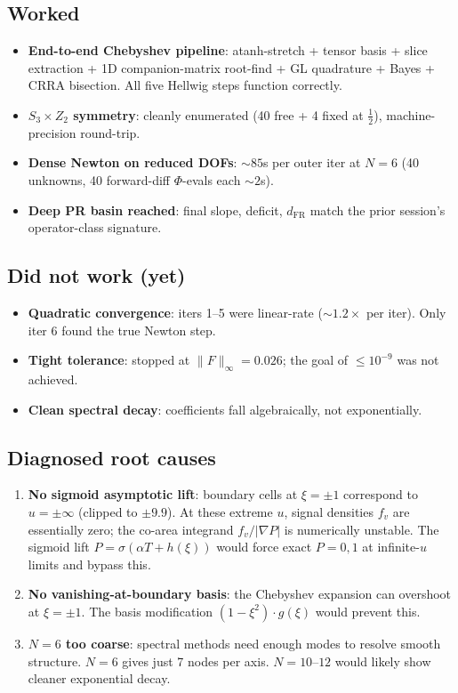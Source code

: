 \documentclass[11pt]{article}
\begin{document}
\subsection*{Worked}
\begin{itemize}
\item \textbf{End-to-end Chebyshev pipeline}: atanh-stretch + tensor basis +
slice extraction + 1D companion-matrix root-find + GL quadrature + Bayes +
CRRA bisection. All five Hellwig steps function correctly.
\item \textbf{$S_3 \times Z_2$ symmetry}: cleanly enumerated (40 free + 4
fixed at $\frac{1}{2}$), machine-precision round-trip.
\item \textbf{Dense Newton on reduced DOFs}: $\sim 85$s per outer iter at
$N=6$ (40 unknowns, 40 forward-diff $\Phi$-evals each $\sim 2$s).
\item \textbf{Deep PR basin reached}: final slope, deficit, $d_\mathrm{FR}$
match the prior session's operator-class signature.
\end{itemize}

\subsection*{Did not work (yet)}
\begin{itemize}
\item \textbf{Quadratic convergence}: iters 1--5 were linear-rate
($\sim 1.2 \times$ per iter). Only iter 6 found the true Newton step.
\item \textbf{Tight tolerance}: stopped at $\|F\|_\infty = 0.026$;
the goal of $\le 10^{-9}$ was not achieved.
\item \textbf{Clean spectral decay}: coefficients fall algebraically,
not exponentially.
\end{itemize}

\subsection*{Diagnosed root causes}
\begin{enumerate}
\item \textbf{No sigmoid asymptotic lift}: boundary cells at $\xi = \pm 1$
correspond to $u = \pm \infty$ (clipped to $\pm 9.9$). At these extreme
$u$, signal densities $f_v$ are essentially zero; the co-area integrand
$f_v / |\nabla P|$ is numerically unstable. The sigmoid lift
$P = \sigma(\alpha T + h(\xi))$ would force exact $P = 0, 1$ at infinite-$u$
limits and bypass this.
\item \textbf{No vanishing-at-boundary basis}: the Chebyshev expansion can
overshoot at $\xi = \pm 1$. The basis modification $(1-\xi^2) \cdot g(\xi)$
would prevent this.
\item \textbf{$N=6$ too coarse}: spectral methods need enough modes to
resolve smooth structure. $N=6$ gives just 7 nodes per axis. $N=10$--$12$
would likely show cleaner exponential decay.
\end{enumerate}
\end{document}
